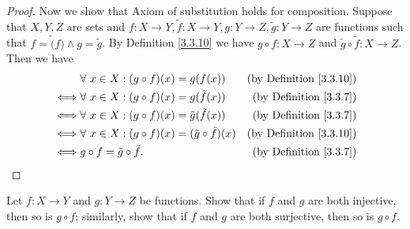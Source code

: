 \begin{proof}
Now we show that Axiom of substitution holds for composition.
Suppose that \(X, Y, Z\) are sets and \(f : X \to Y, \tilde{f} : X \to Y, g : Y \to Z, \tilde{g} : Y \to Z\) are functions such that \(f = \tilde(f) \land g = \tilde{g}\).
By Definition \ref{3.3.10} we have \(g \circ f : X \to Z\) and \(\tilde{g} \circ \tilde{f} : X \to Z\).
Then we have
\begin{align*}
& \forall\ x \in X : (g \circ f)(x) = g(f(x)) & \text{(by Definition \ref{3.3.10})} \\
\iff & \forall\ x \in X : (g \circ f)(x) = g(\tilde{f}(x)) & \text{(by Definition \ref{3.3.7})} \\
\iff & \forall\ x \in X : (g \circ f)(x) = \tilde{g}(\tilde{f}(x)) & \text{(by Definition \ref{3.3.7})} \\
\iff & \forall\ x \in X : (g \circ f)(x) = (\tilde{g} \circ \tilde{f})(x) & \text{(by Definition \ref{3.3.10})} \\
\iff & g \circ f = \tilde{g} \circ \tilde{f}. & \text{(by Definition \ref{3.3.7})}
\end{align*}
\end{proof}

\begin{exercise}\label{ex 3.3.2}
Let \(f : X \to Y\) and \(g : Y \to Z\) be functions.
Show that if \(f\) and \(g\) are both injective, then so is \(g \circ f\);
similarly, show that if \(f\) and \(g\) are both surjective, then so is \(g \circ f\).
\end{exercise}


